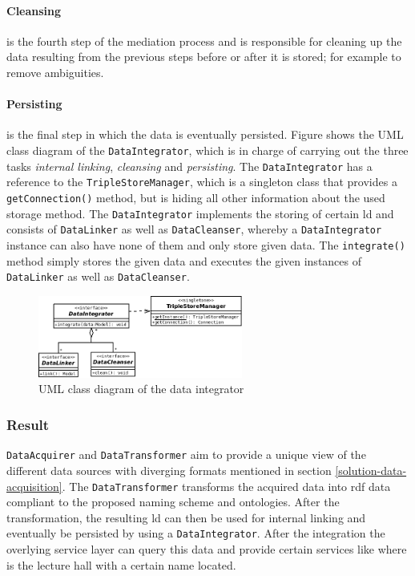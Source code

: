 \documentclass[draft,final]{vutinfth} %
\begin{document}
\paragraph{Cleansing} is the fourth step of the mediation process and is responsible for cleaning up the data resulting from the previous steps before or after it is stored; for example to remove ambiguities.

\paragraph{Persisting} is the final step in which the data is eventually persisted. Figure shows the UML class diagram of the \texttt{DataIntegrator}, which is in charge of carrying out the three tasks \textit{internal linking}, \textit{cleansing} and \textit{persisting}. The \texttt{DataIntegrator} has a reference to the \texttt{TripleStoreManager}, which is a singleton class that provides a \texttt{getConnection()} method, but is hiding all other information about the used storage method. The \texttt{DataIntegrator} implements the storing of certain \gls{ld} and consists of \texttt{DataLinker} as well as \texttt{DataCleanser}, whereby a \texttt{DataIntegrator} instance can also have none of them and only store given data. The \texttt{integrate()} method simply stores the given data and executes the given instances of \texttt{DataLinker} as well as \texttt{DataCleanser}. 

\begin{figure}[h]
    \centering
    \includegraphics[width=0.6\textwidth]{graphics/solution/architecture/dataintegrator.png}
    \caption{UML class diagram of the data integrator}
    \label{fig:solution-architectural-prototype:acquirer-uml-class-dia}
\end{figure}

\subsubsection{Result}
\texttt{DataAcquirer} and \texttt{DataTransformer} aim to provide a unique view of the different data sources with diverging formats mentioned in section \ref{solution-data-acquisition}. The \texttt{DataTransformer} transforms the acquired data into \gls{rdf} data compliant to the proposed naming scheme and ontologies. After the transformation, the resulting \gls{ld} can then be used for internal linking and eventually be persisted by using a \texttt{DataIntegrator}. After the integration the overlying service layer can query this data and provide certain services like where is the lecture hall with a certain name located.
\end{document}
